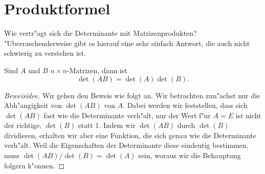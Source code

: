 \section{Produktformel}
Wie vertr"agt sich die Determinante mit Matrizenprodukten?
"Uberraschenderweise gibt es hierauf eine sehr einfach Antwort,
die auch nicht schwierig zu verstehen ist.

\begin{satz}\label{detprodukt}
Sind $A$ und $B$ $n\times n$-Matrizen, dann ist
\[
\det(AB)=\det(A)\det(B).
\]
\end{satz}

\begin{proof}[Beweisidee]
Wir gehen den Beweis wie folgt an. Wir betrachten zun"achst nur die
Abh"angigkeit von $\det(AB)$ von $A$. Dabei werden wir feststellen,
dass sich $\det(AB)$ fast wie die Determinante verh"alt, nur der
Wert f"ur $A=E$ ist nicht der richtige, $\det(B)$ statt $1$. Indem wir
$\det(AB)$ durch $\det(B)$ dividieren, erhalten wir aber eine Funktion,
die sich genau wie die Determinante verh"alt.
Weil die Eigenschaften der Determinante diese eindeutig bestimmen, muss
$\det(AB)/\det(B)=\det(A)$ sein, woraus wir die Behauptung folgern k"onnen.
\end{proof}


